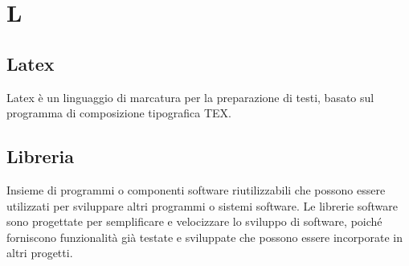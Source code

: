 \section{L}
\subsection{Latex}%
Latex è un linguaggio di marcatura per la preparazione di testi, basato sul programma di composizione tipografica TEX.
\subsection{Libreria}%
Insieme di programmi o componenti software riutilizzabili che possono essere utilizzati per 
sviluppare altri programmi o sistemi software. Le librerie software sono progettate per semplificare e velocizzare lo 
sviluppo di software, poiché forniscono funzionalità già testate e sviluppate che possono essere incorporate in altri progetti.
\clearpage